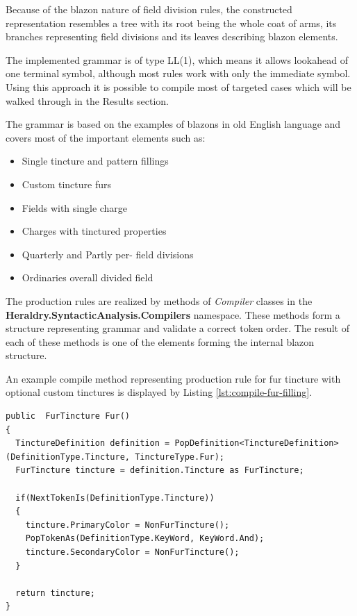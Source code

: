 \documentclass[12pt,a4paper]{article}
\begin{document}
Because of the blazon nature of field division rules, the constructed representation resembles a tree with its root being the whole coat of arms, its branches representing field divisions and its leaves describing blazon elements.

The implemented grammar is of type LL(1), which means it allows lookahead of one terminal symbol, although most rules work with only the immediate symbol.
Using this approach it is possible to compile most of targeted cases which will be walked through in the Results section.

The grammar is based on the examples of blazons in old English language and covers most of the important elements such as:
\begin{itemize}
\setlength\itemsep{-0.5em}
\item Single tincture and pattern fillings
\item Custom tincture furs
\item Fields with single charge
\item Charges with tinctured properties
\item Quarterly and Partly per- field divisions
\item Ordinaries overall divided field
\end{itemize}

The production rules are realized by methods of \textit{Compiler} classes in the \textbf{Heraldry.SyntacticAnalysis.Compilers} namespace.
These methods form a structure representing grammar and validate a correct token order. The result of each of these methods is one of the elements forming the internal blazon structure.

An example compile method representing production rule for fur tincture with optional custom tinctures is displayed by Listing \ref{lst:compile-fur-filling}.
\newpage
\begin{lstlisting}[frame=single,label={lst:compile-fur-filling},caption={Compile method representing production rule of fur filling},captionpos=b,basicstyle=\small]
public  FurTincture Fur()
{
  TinctureDefinition definition = PopDefinition<TinctureDefinition>(DefinitionType.Tincture, TinctureType.Fur);
  FurTincture tincture = definition.Tincture as FurTincture;

  if(NextTokenIs(DefinitionType.Tincture))
  {
    tincture.PrimaryColor = NonFurTincture();
    PopTokenAs(DefinitionType.KeyWord, KeyWord.And);
    tincture.SecondaryColor = NonFurTincture();
  }

  return tincture;
}
\end{lstlisting}
\end{document}

